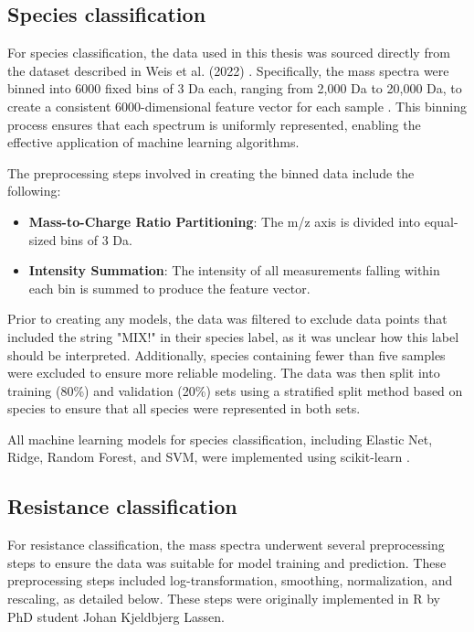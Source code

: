 \documentclass[english,11pt,a4paper,titlepage]{article}
\begin{document}
	\subsection*{Species classification}
	For species classification, the data used in this thesis was sourced directly from the dataset described in Weis et al. (2022) \cite{weis2021driams,weisDirectAntimicrobialResistance2022}. Specifically, the mass spectra were binned into 6000 fixed bins of 3 Da each, ranging from 2,000 Da to 20,000 Da, to create a consistent 6000-dimensional feature vector for each sample . This binning process ensures that each spectrum is uniformly represented, enabling the effective application of machine learning algorithms.
	
	The preprocessing steps involved in creating the binned data include the following:
	
	\begin{itemize}
		\item \textbf{Mass-to-Charge Ratio Partitioning}: The m/z axis is divided into equal-sized bins of 3 Da.
		\item \textbf{Intensity Summation}: The intensity of all measurements falling within each bin is summed to produce the feature vector.
	\end{itemize}
	
	Prior to creating any models, the data was filtered to exclude data points that included the string "MIX!" in their species label, as it was unclear how this label should be interpreted. Additionally, species containing fewer than five samples were excluded to ensure more reliable modeling. The data was then split into training (80\%) and validation (20\%) sets using a stratified split method based on species to ensure that all species were represented in both sets.
	
	All machine learning models for species classification, including Elastic Net, Ridge, Random Forest, and SVM, were implemented using scikit-learn \cite{scikit-learn}.
	
	\subsection*{Resistance classification}
	For resistance classification, the mass spectra underwent several preprocessing steps to ensure the data was suitable for model training and prediction. These preprocessing steps included log-transformation, smoothing, normalization, and rescaling, as detailed below. These steps were originally implemented in R by PhD student Johan Kjeldbjerg Lassen.
	
\end{document}
